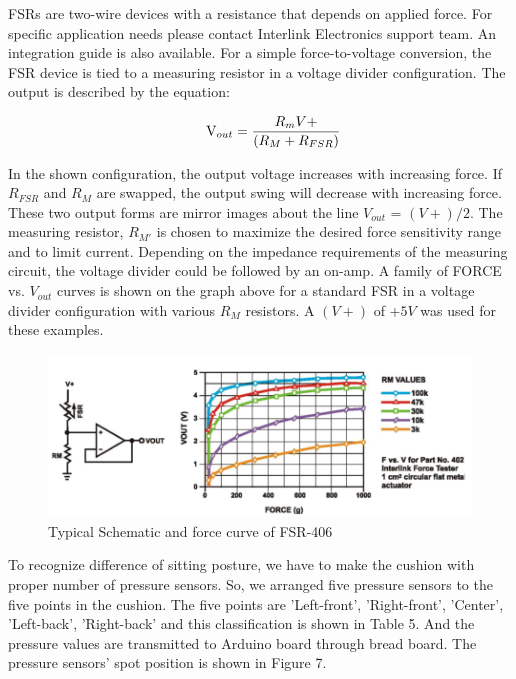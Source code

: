\documentclass[conference]{IEEEtran}
\begin{document}
FSRs are two-wire devices with a resistance that depends on applied force. For specific application needs please contact Interlink Electronics support team. An integration guide is also available. For a simple force-to-voltage conversion, the FSR device is tied to a measuring resistor in a voltage divider configuration. The output is described by the equation:


\begin{displaymath}
\qquad\mathrm{V}_{out} =\frac{{R}_mV+}{({R}_M+{R}_{FSR})}\\
\end{displaymath}

In the shown configuration, the output voltage increases with increasing force. If ${R}_{FSR}$ and ${R}_{M}$ are swapped, the output swing will decrease with increasing force. These two output forms are mirror images about the line ${V}_{out}$  = $(V+) / 2$. The measuring resistor, ${R}_{M'}$ is chosen to maximize the desired force sensitivity range and to limit current. Depending on the impedance requirements of the measuring circuit, the voltage divider could be followed by an on-amp. A family of FORCE vs. ${V}_{out}$ curves is shown on the graph above for a standard FSR in a voltage divider configuration with various ${R}_{M}$ resistors. A $(V+)$ of $+5V$ was used for these examples.

\begin{figure}[htbp]
\begin{center}
    \includegraphics[scale=0.375]{img_07.png}
    \caption{Typical Schematic and force curve of FSR-406} 
\end{center}
\end{figure}

To recognize difference of sitting posture, we have to make the cushion with proper number of pressure sensors. So, we arranged five pressure sensors to the five points in the cushion. The five points are 'Left-front', 'Right-front', 'Center', 'Left-back', 'Right-back' and this classification is shown in Table 5. And the pressure values are transmitted to Arduino board through bread board. The pressure sensors' spot position is shown in Figure 7.
\end{document}
